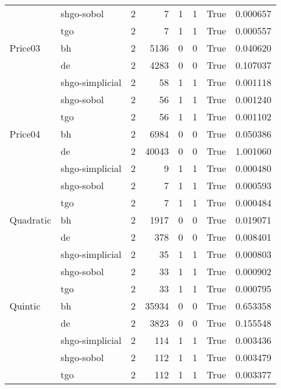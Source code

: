 \begin{longtable}{llrrrrlr}
         & shgo-sobol &     2 &        7 &      1 &       1 &    True &    0.000657 \\
         & tgo &     2 &        7 &      1 &       1 &    True &    0.000557 \\
Price03 & bh &     2 &     5136 &      0 &       0 &    True &    0.040620 \\
         & de &     2 &     4283 &      0 &       0 &    True &    0.107037 \\
         & shgo-simplicial &     2 &       58 &      1 &       1 &    True &    0.001118 \\
         & shgo-sobol &     2 &       56 &      1 &       1 &    True &    0.001240 \\
         & tgo &     2 &       56 &      1 &       1 &    True &    0.001102 \\
Price04 & bh &     2 &     6984 &      0 &       0 &    True &    0.050386 \\
         & de &     2 &    40043 &      0 &       0 &    True &    1.001060 \\
         & shgo-simplicial &     2 &        9 &      1 &       1 &    True &    0.000480 \\
         & shgo-sobol &     2 &        7 &      1 &       1 &    True &    0.000593 \\
         & tgo &     2 &        7 &      1 &       1 &    True &    0.000484 \\
Quadratic & bh &     2 &     1917 &      0 &       0 &    True &    0.019071 \\
         & de &     2 &      378 &      0 &       0 &    True &    0.008401 \\
         & shgo-simplicial &     2 &       35 &      1 &       1 &    True &    0.000803 \\
         & shgo-sobol &     2 &       33 &      1 &       1 &    True &    0.000902 \\
         & tgo &     2 &       33 &      1 &       1 &    True &    0.000795 \\
Quintic & bh &     2 &    35934 &      0 &       0 &    True &    0.653358 \\
         & de &     2 &     3823 &      0 &       0 &    True &    0.155548 \\
         & shgo-simplicial &     2 &      114 &      1 &       1 &    True &    0.003436 \\
         & shgo-sobol &     2 &      112 &      1 &       1 &    True &    0.003479 \\
         & tgo &     2 &      112 &      1 &       1 &    True &    0.003377 \\

\end{longtable}
